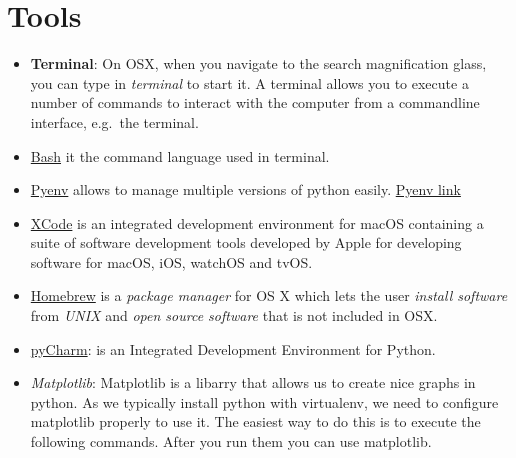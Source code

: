 

\chapter{Tools}\label{tools}

\FILENAME

\begin{itemize}
\item
  \textbf{Terminal}: On OSX, when you navigate to the search
  magnification glass, you can type in \emph{terminal} to start it. A
  terminal allows you to execute a number of commands to interact with
  the computer from a commandline interface, e.g.~the terminal.
\item
  \href{https://linuxconfig.org/bash-scripting-tutorial}{Bash} it the
  command language used in terminal.
\item
  \href{https://cloudmesh.github.io/classes/lesson/prg/pyenv.html?highlight=xcode\#install-pyenv-on-osxhttps://cloudmesh.github.io/classes/lesson/prg/pyenv.html?highlight=xcode\#install-pyenv-on-osx}{Pyenv}
  allows to manage multiple versions of python easily.
  \href{https://github.com/pyenv/pyenv\#how-it-works}{Pyenv link}
\item
  \href{https://cloudmesh.github.io/classes/lesson/prg/pyenv.html?highlight=xcode\#install-pyenv-on-osxhttps://cloudmesh.github.io/classes/lesson/prg/pyenv.html?highlight=xcode\#install-pyenv-on-osx}{XCode}
  is an integrated development environment for macOS containing a suite
  of software development tools developed by Apple for developing
  software for macOS, iOS, watchOS and tvOS.
\item
  \href{https://brew.sh}{Homebrew} is a \emph{package manager} for OS X
  which lets the user \emph{install software} from \emph{UNIX} and
  \emph{open source software} that is not included in OSX.
\item
  \href{https://www.jetbrains.com/pycharm/download/download-thanks.html?platform=mac\&code=PCC}{pyCharm}:
  is an Integrated Development Environment for Python.
\item
  \emph{Matplotlib}: Matplotlib is a libarry that allows us to create
  nice graphs in python. As we typically install python with virtualenv,
  we need to configure matplotlib properly to use it. The easiest way to
  do this is to execute the following commands. After you run them you
  can use matplotlib.


\end{itemize}
